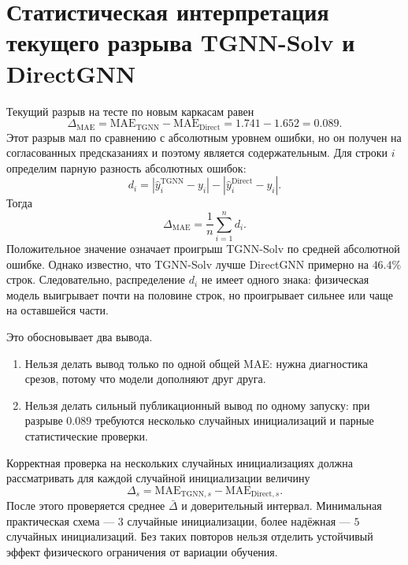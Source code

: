 \documentclass[11pt]{article}
\newcommand{\mae}{\mathrm{MAE}}
\newcommand{\abs}[1]{\left\lvert #1 \right\rvert}
\theoremstyle{definition}
\begin{document}
\section{Статистическая интерпретация текущего разрыва TGNN-Solv и DirectGNN}
\label{app:statistics}

Текущий разрыв на тесте по новым каркасам равен
\begin{equation*}
    \Delta_{\mathrm{MAE}}
    =
    \mae_{\mathrm{TGNN}}-\mae_{\mathrm{Direct}}
    =
    1.741-1.652
    =
    0.089.
\end{equation*}
Этот разрыв мал по сравнению с абсолютным уровнем ошибки, но он получен на согласованных предсказаниях и поэтому является содержательным. Для строки $i$ определим парную разность абсолютных ошибок:
\begin{equation*}
    d_i
    =
    \abs{\widehat y_i^{\mathrm{TGNN}}-y_i}
    -
    \abs{\widehat y_i^{\mathrm{Direct}}-y_i}.
\end{equation*}
Тогда
\begin{equation*}
    \Delta_{\mathrm{MAE}}=\frac{1}{n}\sum_{i=1}^n d_i.
\end{equation*}
Положительное значение означает проигрыш TGNN-Solv по средней абсолютной ошибке. Однако известно, что TGNN-Solv лучше DirectGNN примерно на $46.4\%$ строк. Следовательно, распределение $d_i$ не имеет одного знака: физическая модель выигрывает почти на половине строк, но проигрывает сильнее или чаще на оставшейся части.

Это обосновывает два вывода.

\begin{enumerate}
    \item Нельзя делать вывод только по одной общей MAE: нужна диагностика срезов, потому что модели дополняют друг друга.
    \item Нельзя делать сильный публикационный вывод по одному запуску: при разрыве $0.089$ требуются несколько случайных инициализаций и парные статистические проверки.
\end{enumerate}

Корректная проверка на нескольких случайных инициализациях должна рассматривать для каждой случайной инициализации величину
\begin{equation*}
    \Delta_s
    =
    \mae_{\mathrm{TGNN},s}
    -
    \mae_{\mathrm{Direct},s}.
\end{equation*}
После этого проверяется среднее $\bar\Delta$ и доверительный интервал. Минимальная практическая схема --- $3$ случайные инициализации, более надёжная --- $5$ случайных инициализаций. Без таких повторов нельзя отделить устойчивый эффект физического ограничения от вариации обучения.
\end{document}
